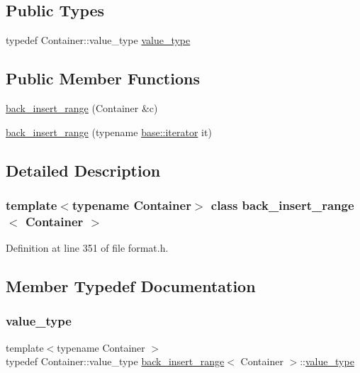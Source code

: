 \subsection*{Public Types}
\begin{DoxyCompactItemize}
\item 
typedef Container\+::value\+\_\+type \hyperlink{classback__insert__range_ac07fd9dab7b7b4c05137a00ef5188d0d}{value\+\_\+type}
\end{DoxyCompactItemize}
\subsection*{Public Member Functions}
\begin{DoxyCompactItemize}
\item 
\hyperlink{classback__insert__range_a9ec53a98255fd8c56fd6038400be0ba8}{back\+\_\+insert\+\_\+range} (Container \&c)
\item 
\hyperlink{classback__insert__range_a5ae08e1f54068a6a3e6e9cbf6af158c5}{back\+\_\+insert\+\_\+range} (typename \hyperlink{classoutput__range_ad58eda348d78f3d205ed58a632d75a83}{base\+::iterator} it)
\end{DoxyCompactItemize}


\subsection{Detailed Description}
\subsubsection*{template$<$typename Container$>$\newline
class back\+\_\+insert\+\_\+range$<$ Container $>$}



Definition at line 351 of file format.\+h.



\subsection{Member Typedef Documentation}
\mbox{\label{classback__insert__range_ac07fd9dab7b7b4c05137a00ef5188d0d}} 
\subsubsection{\texorpdfstring{value\+\_\+type}{value\_type}}
{\footnotesize\ttfamily template$<$typename Container $>$ \\
typedef Container\+::value\+\_\+type \hyperlink{classback__insert__range}{back\+\_\+insert\+\_\+range}$<$ Container $>$\+::\hyperlink{classback__insert__range_ac07fd9dab7b7b4c05137a00ef5188d0d}{value\+\_\+type}}



